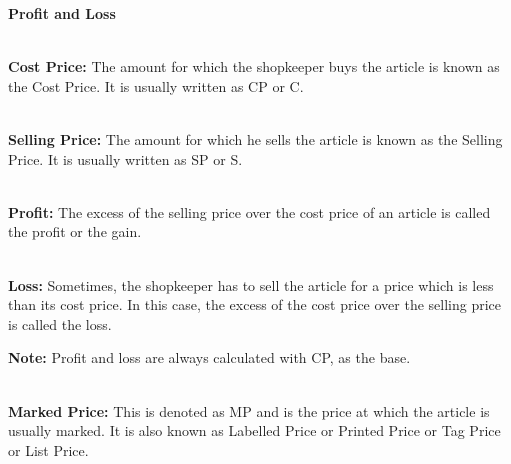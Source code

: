 \documentclass{article}
\begin{document}
\noindent \begin{center}
	{\Large \textbf{Profit and Loss \\}}
\end{center}

\noindent 

\noindent 

\noindent 


\noindent 

\noindent 

\noindent 

\noindent \\ \textbf{Cost Price: }The amount for which the shopkeeper buys the article is known as the Cost Price. It is usually written as CP or C.

\noindent 

\noindent 

\noindent \\ \textbf{Selling Price: }The amount for which he sells the article is known as the Selling Price. It is usually written as SP or S.

\noindent 

\noindent 

\noindent \\ \textbf{Profit: }The excess of the selling price over the cost price of an article is called the profit or the gain.

\noindent 

\noindent 

\noindent \\ \textbf{Loss: }Sometimes, the shopkeeper has to sell the article for a price which is less than its cost price. In this case, the excess of the cost price over the selling price is called the loss.

\noindent \textbf{Note: }Profit and loss are always calculated with CP, as the base.

\noindent 

\noindent 

\noindent 

\noindent \\ \textbf{Marked Price: }This is denoted as MP and is the price at which the article is usually marked.  It is also known as Labelled Price or Printed Price or Tag Price or List Price.

\noindent 

\noindent 
\end{document}
